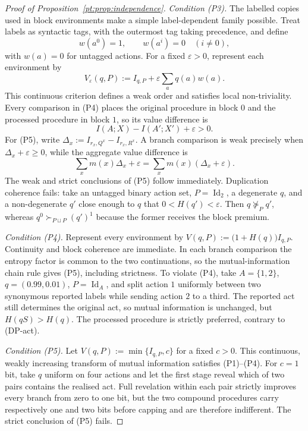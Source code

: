 \documentclass[11pt,a4paper]{article}
\theoremstyle{definition}
\newcommand{\Sh}{H}
\newcommand{\Id}{\operatorname{Id}}
\newcommand{\1}{\mathbf 1}
\begin{document}
\begin{proof}[Proof of Proposition~\ref{pt:prop:independence}]
\emph{Condition \textup{(P3)}.}  The labelled copies used in block environments make a simple label-dependent family
possible.  Treat labels as syntactic tags, with the outermost tag taking precedence, and define
\[
w(a^0)=1,
\qquad
w(a^i)=0\quad(i\ne0),
\]
with $w(a)=0$ for untagged actions.  For a fixed $\varepsilon>0$, represent each environment by
\[
V_\varepsilon(q,P):=I_{q,P}+\varepsilon\sum_aq(a)w(a).
\]
This continuous criterion defines a weak order and satisfies local non-triviality.  Every comparison in \textup{(P4)}
places the original procedure in block $0$ and the processed procedure in block $1$, so its value difference is
\[
I(A;X)-I(A';X')+\varepsilon>0.
\]
For \textup{(P5)}, write $\Delta_x:=I_{r_x,Q^x}-I_{r_x,R^x}$.  A branch comparison is weak precisely when
$\Delta_x+\varepsilon\ge0$, while the aggregate value difference is
\[
\sum_x m(x)\Delta_x+\varepsilon
=\sum_x m(x)(\Delta_x+\varepsilon).
\]
The weak and strict conclusions of \textup{(P5)} follow immediately.  Duplication coherence fails: take an untagged
binary action set, $P=\Id_2$, a degenerate $q$, and a non-degenerate $q'$ close enough to $q$ that
$0<\Sh(q')<\varepsilon$.  Then $q\not\succeq_Pq'$, whereas
$q^0\succ_{P\sqcup P}(q')^1$ because the former receives the block premium.

\emph{Condition \textup{(P4)}.}  Represent every environment by
$V(q,P):=\bigl(1+\Sh(q)\bigr)I_{q,P}$.  Continuity and block coherence are immediate.  In each branch comparison the
entropy factor is common to the two continuations, so the mutual-information chain rule gives \textup{(P5)}, including
strictness.  To violate \textup{(P4)}, take $A=\{1,2\}$, $q=(0.99,0.01)$, $P=\Id_A$, and split action $1$ uniformly
between two synonymous reported labels while sending action $2$ to a third.  The reported act still determines the
original act, so mutual information is unchanged, but $\Sh(qS)>\Sh(q)$.  The processed procedure is strictly preferred,
contrary to \textup{(DP-act)}.

\emph{Condition \textup{(P5)}.}  Let $V(q,P):=\min\{I_{q,P},c\}$ for a fixed $c>0$.  This continuous, weakly increasing
transform of mutual information satisfies \textup{(P1)}--\textup{(P4)}.  For $c=1$ bit, take $q$ uniform on four
actions and let the first stage reveal which of two pairs contains the realised act.  Full revelation within each pair
strictly improves every branch from zero to one bit, but the two compound procedures carry respectively one and two bits
before capping and are therefore indifferent.  The strict conclusion of \textup{(P5)} fails.
\end{proof}
\end{document}
